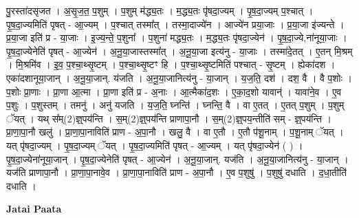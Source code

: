 \documentclass[17pt]{extarticle}
\begin{document}
पु॒रस्ता॑दसृजत । अ॒सृ॒ज॒त॒ प॒शुम् । प॒शुम् म॑द्ध्य॒तः । म॒द्ध्य॒तः पृ॑षदा॒ज्यम् । पृ॒ष॒दा॒ज्यम् प॒श्चात् । पृ॒ष॒दा॒ज्यमिति॑ पृषत् - आ॒ज्यम् । प॒श्चात् तस्मा᳚त् । तस्मा॒दाज्ये॑न । आज्ये॑न प्रया॒जाः । प्र॒या॒जा इ॑ज्यन्ते । प्र॒या॒जा इति॑ प्र - या॒जाः । इ॒ज्य॒न्ते॒ प॒शुना᳚ । प॒शुना॑ मद्ध्य॒तः । म॒द्ध्य॒तः पृ॑षदा॒ज्येन॑ । पृ॒ष॒दा॒ज्ये,ना॑नूया॒जाः । पृ॒ष॒दा॒ज्येनेति॑ पृषत् - आ॒ज्येन॑ । अ॒नू॒या॒जास्तस्मा᳚त् । अ॒नू॒या॒जा इत्य॑नु - या॒जाः । तस्मा॑दे॒तत् । ए॒तन् मि॒श्रम् । मि॒श्रमि॑व । इ॒व॒ प॒श्चा॒थ्सृ॒ष्टम् । प॒श्चा॒थ्सृ॒ष्टꣳ हि । प॒श्चा॒थ्सृ॒ष्टमिति॑ पश्चात् - सृ॒ष्टम् । ह्येका॑दश । एका॑दशानूया॒जान् । अ॒नू॒या॒जान्. य॑जति । अ॒नू॒या॒जानित्य॑नु - या॒जान् । य॒ज॒ति॒ दश॑ । दश॒ वै । वै प॒शोः । प॒शोः प्रा॒णाः । प्रा॒णा आ॒त्मा । प्रा॒णा इति॑ प्र - अ॒नाः । आ॒त्मैका॑द॒शः । ए॒का॒द॒शो यावान्॑ । यावा॑ने॒व । ए॒व प॒शुः । प॒शुस्तम् । तमनु॑ । अनु॑ यजति । य॒ज॒ति॒ घ्नन्ति॑ । घ्नन्ति॒ वै । वा ए॒तत् । ए॒तत् प॒शुम् । प॒शुम् ॅयत् । यथ् स᳚म्(2)ज्ञ्॒पय॑न्ति । स॒म्(2)ज्ञ्॒पय॑न्ति प्राणापा॒नौ । स॒म्(2)ज्ञ्॒पय॒न्तीति॑ सम् - ज्ञ्॒पय॑न्ति । प्रा॒णा॒पा॒नौ खलु॑ । प्रा॒णा॒पा॒नाविति॑ प्राण - अ॒पा॒नौ । खलु॒ वै । वा ए॒तौ । ए॒तौ प॑शू॒नाम् । प॒शू॒नाम् ॅयत् । यत् पृ॑षदा॒ज्यम् । पृ॒ष॒दा॒ज्यम् ॅयत् । पृ॒ष॒दा॒ज्यमिति॑ पृषत् - आ॒ज्यम् । यत् पृ॑षदा॒ज्येन॑ ( ) । पृ॒ष॒दा॒ज्येना॑नूया॒जान् । पृ॒ष॒दा॒ज्येनेति॑ पृषत् - आ॒ज्येन॑ । अ॒नू॒या॒जान्. यज॑ति । अ॒नू॒या॒जानित्य॑नु - या॒जान् । यज॑ति प्राणापा॒नौ । प्रा॒णा॒पा॒नावे॒व । प्रा॒णा॒पा॒नाविति॑ प्राण - अ॒पा॒नौ । ए॒व प॒शुषु॑ । प॒शुषु॑ दधाति । द॒धा॒तीति॑ दधाति । \newline

\textbf{Jatai Paata} \newline
\end{document}
